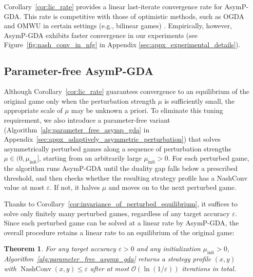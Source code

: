 \documentclass{article}
\DeclareMathOperator{\NashConv}{NashConv}
\theoremstyle{plain}
\newtheorem{theorem}{Theorem}[section]
\begin{document}
Corollary~\ref{cor:lic_rate} provides a linear last-iterate convergence rate for AsymP-GDA.
This rate is competitive with those of optimistic methods, such as OGDA and OMWU in certain settings (e.g., bilinear games) \citep{wei2020linear}.
Empirically, however, AsymP-GDA exhibits faster convergence in our experiments (see Figure~\ref{fig:nash_conv_in_nfg} in Appendix \ref{sec:appx_experimental_details}).


\subsection{Parameter-free AsymP-GDA}
\label{sec:with_adaptive_shrinking_mechanism}
\normalfont
Although Corollary~\ref{cor:lic_rate} guarantees convergence to an equilibrium of the original game only when the perturbation strength $\mu$ is sufficiently small, the appropriate scale of $\mu$ may be unknown a priori.
To eliminate this tuning requirement, we also introduce a parameter-free variant (Algorithm~\ref{alg:parameter_free_asymp_gda} in Appendix~\ref{sec:appx_adaptively_asymmetric_perturbation}) that solves asymmetrically perturbed games along a sequence of perturbation strengths $\mu\in(0,\mu_{\mathrm{init}}]$, starting from an arbitrarily large $\mu_{\mathrm{init}}>0$.
For each perturbed game, the algorithm runs AsymP-GDA until the duality gap falls below a prescribed threshold, and then checks whether the resulting strategy profile has a NashConv value at most $\varepsilon$.
If not, it halves $\mu$ and moves on to the next perturbed game.

Thanks to Corollary~\ref{cor:invariance_of_perturbed_equilibrium}, it suffices to solve only finitely many perturbed games, regardless of any target accuracy $\varepsilon$.
Since each perturbed game can be solved at a linear rate by AsymP-GDA, the overall procedure retains a linear rate to an equilibrium of the original game:
\begin{theorem}
    For any target accuracy $\varepsilon>0$ and any initialization $\mu_{\mathrm{init}}>0$, Algorithm~\ref{alg:parameter_free_asymp_gda} returns a strategy profile $(x,y)$ with $\NashConv(x,y)\le \varepsilon$ after at most $\mathcal{O}(\ln(1/\varepsilon))$ iterations in total.
    \label{thm:lic_rate_with_adaptive_shrinking}
\end{theorem}
\end{document}
